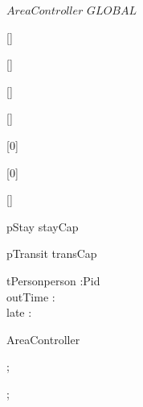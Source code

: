 \kClass $AreaController$ \kISO $GLOBAL$
\par
\kInstanceVarDef
\parlinebr
\begin{insvar}
\end{insvar}
\begin{insvar}
[{\Emptymap }]
\end{insvar}
\begin{insvar}
[{\set{}}]
\end{insvar}
\begin{insvar}
[{\Emptymap }]
\end{insvar}
\begin{insvar}
[{\set{}}]
\end{insvar}
\begin{insvar}
[{0}]
\end{insvar}
\begin{insvar}
[{0}]
\end{insvar}
\begin{insvar}
[{\True }]
\end{insvar}
\begin{instinvfn}
 \Card  \Dom pStay \Le stayCap\end{instinvfn}
\begin{instinvfn}
 \Card pTransit \Le transCap\end{instinvfn}
\par
\kTypes
\begin{record}{tPerson}person :{Pid} \\
outTime :{\Nat } \\
late :{\Bool } \\
\end{record}
\kOperations
{}\begin{op}[e]{AreaController}%
\signature{Aid \Oto AreaController}
\begin{blockstmt}
 ; \\
\end{blockstmt};
\end{op}

